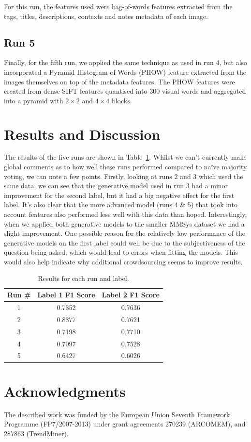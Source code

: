 \documentclass{../acm_proc_article-me11_tweaked}
\begin{document}
For this run, the features used were bag-of-words features extracted from the tags, titles, descriptions, contexts and notes metadata of each image.

\subsection{Run 5}
Finally, for the fifth run, we applied the same technique as used in run 4, but also incorporated a Pyramid Histogram of Words (PHOW) feature extracted from the images themselves on top of the metadata features. The PHOW features were created from dense SIFT features quantised into 300 visual words and aggregated into a pyramid with $2{\times}2$ and $4{\times}4$ blocks.

\section{Results and Discussion}
The results of the five runs are shown in Table~\ref{tab:results}. Whilst we can't currently make global comments as to how well these runs performed compared to na\"ive majority voting, we can note a few points. Firstly, looking at runs 2 and 3 which used the same data, we can see that the generative model used in run 3 had a minor improvement for the second label, but it had a big negative effect for the first label. It's also clear that the more advanced model (runs 4 \& 5) that took into account features also performed less well with this data than hoped. Interestingly, when we applied both generative models to the smaller MMSys dataset we had a slight improvement. One possible reason for the relatively low performance of the generative models on the first label could well be due to the subjectiveness of the question being asked, which would lead to errors when fitting the models. This would also help indicate why additional crowdsourcing seems to improve results.

\begin{table}
	\centering
	\caption{\label{tab:results}Results for each run and label.}
	\begin{tabular}{|c|c|c|}
		\hline
		Run \# & Label 1 F1 Score & Label 2 F1 Score \\ \hline \hline
		1 & 0.7352 & 0.7636 \\ \hline
		2 & 0.8377 & 0.7621 \\ \hline
		3 & 0.7198 & 0.7710 \\ \hline
		4 & 0.7097 & 0.7528 \\ \hline
		5 & 0.6427 & 0.6026 \\ \hline
	\end{tabular}
\end{table}

\section{Acknowledgments}
The described work was funded by the European Union Seventh Framework Programme (FP7/2007-2013) under grant agreements 270239 (ARCOMEM), and 287863 (TrendMiner).



\end{document}
